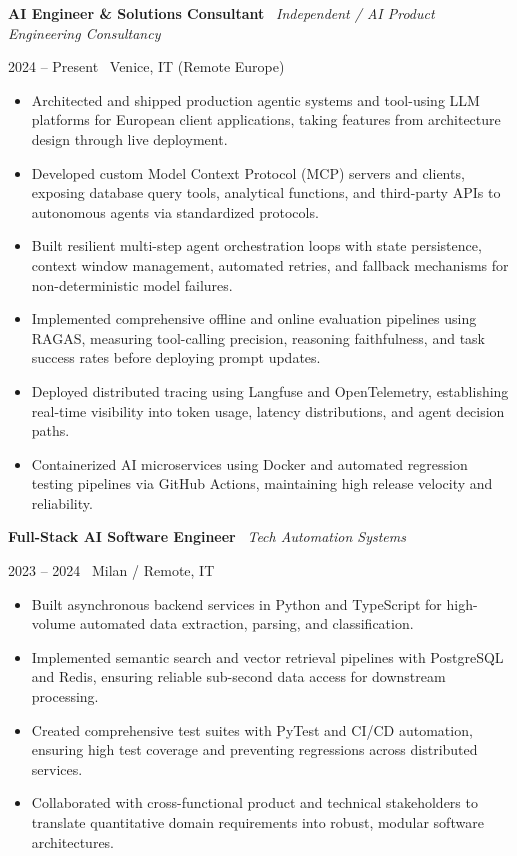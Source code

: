 \documentclass[a4paper,10pt]{article}
\newcommand{\role}[4]{%
  \vspace{2pt}\noindent
  \begin{minipage}[t]{0.70\textwidth}\raggedright\textbf{#1} \textbullet\ \textit{#3}\end{minipage}%
  \hfill
  \begin{minipage}[t]{0.28\textwidth}\raggedleft\footnotesize\color{gray}#2 \textbullet\ #4\end{minipage}%
  \vspace{1pt}%
}
\begin{document}
\role{AI Engineer \& Solutions Consultant}{2024 -- Present}{Independent / AI Product Engineering Consultancy}{Venice, IT (Remote Europe)}
\begin{itemize}
  \item Architected and shipped production agentic systems and tool-using LLM platforms for European client applications, taking features from architecture design through live deployment.
  \item Developed custom Model Context Protocol (MCP) servers and clients, exposing database query tools, analytical functions, and third-party APIs to autonomous agents via standardized protocols.
  \item Built resilient multi-step agent orchestration loops with state persistence, context window management, automated retries, and fallback mechanisms for non-deterministic model failures.
  \item Implemented comprehensive offline and online evaluation pipelines using RAGAS, measuring tool-calling precision, reasoning faithfulness, and task success rates before deploying prompt updates.
  \item Deployed distributed tracing using Langfuse and OpenTelemetry, establishing real-time visibility into token usage, latency distributions, and agent decision paths.
  \item Containerized AI microservices using Docker and automated regression testing pipelines via GitHub Actions, maintaining high release velocity and reliability.
\end{itemize}

\vspace{3pt}
\role{Full-Stack AI Software Engineer}{2023 -- 2024}{Tech Automation Systems}{Milan / Remote, IT}
\begin{itemize}
  \item Built asynchronous backend services in Python and TypeScript for high-volume automated data extraction, parsing, and classification.
  \item Implemented semantic search and vector retrieval pipelines with PostgreSQL and Redis, ensuring reliable sub-second data access for downstream processing.
  \item Created comprehensive test suites with PyTest and CI/CD automation, ensuring high test coverage and preventing regressions across distributed services.
  \item Collaborated with cross-functional product and technical stakeholders to translate quantitative domain requirements into robust, modular software architectures.
\end{itemize}
\end{document}

